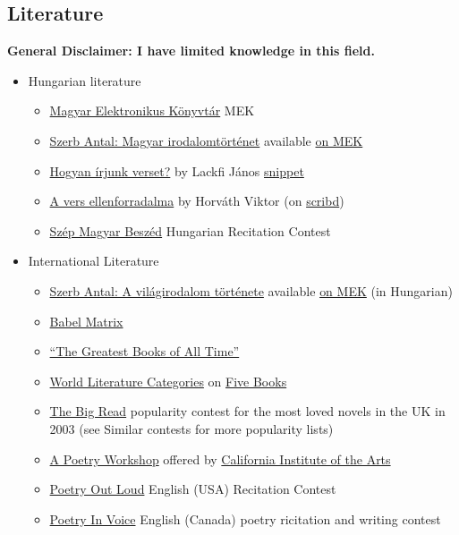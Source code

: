\documentclass{article}
\begin{document}
\subsection{Literature}
\textbf{General Disclaimer: I have limited knowledge in this field.}


\begin{itemize}
    \item Hungarian literature
    \begin{itemize}
        \item \href{https://mek.oszk.hu/}{Magyar Elektronikus Könyvtár} MEK
        \item \href{https://moly.hu/konyvek/szerb-antal-magyar-irodalomtortenet}{Szerb Antal: Magyar irodalomtörténet} available \href{https://mek.oszk.hu/14800/14871/}{on MEK}
        \item \href{https://moly.hu/konyvek/lackfi-janos-hogyan-irjunk-verset}{Hogyan írjunk verset?} by Lackfi János \href{https://olvassbele.com/2021/02/05/lackfi-janos-hogyan-irjunk-verset-reszlet/}{snippet}
        \item \href{https://moly.hu/konyvek/horvath-viktor-a-vers-ellenforradalma}{A vers ellenforradalma} by Horváth Viktor (on \href{https://www.scribd.com/book/342092705/A-vers-ellenforradalma-A-versiras-es-versforditas-tanulasa-es-tanitasa}{scribd})
        \item \href{https://szepmagyarbeszed.hu/}{Szép Magyar Beszéd} Hungarian Recitation Contest
    \end{itemize}
    \item International Literature
    \begin{itemize}
        \item \href{https://moly.hu/konyvek/szerb-antal-a-vilagirodalom-tortenete}{Szerb Antal: A világirodalom története} available \href{https://mek.oszk.hu/14800/14872/}{on MEK} (in Hungarian)
        \item \href{https://www.babelmatrix.org/}{Babel Matrix}
        \item \href{https://thegreatestbooks.org/}{``The Greatest Books of All Time''}
        \item \href{https://fivebooks.com/category/fiction/world-literature-books/}{World Literature Categories} on \href{https://fivebooks.com/}{Five Books}
        \item \href{https://en.wikipedia.org/wiki/The_Big_Read}{The Big Read} popularity contest for the most loved novels in the UK in 2003 (see Similar contests for more popularity lists) 
        \item \href{https://www.coursera.org/learn/poetry-workshop}{A Poetry Workshop} offered by \href{https://calarts.edu/}{California Institute of the Arts}
        \item \href{https://www.poetryoutloud.org/}{Poetry Out Loud} English (USA) Recitation Contest
        \item \href{https://www.poetryinvoice.com/}{Poetry In Voice} English (Canada) poetry ricitation and writing contest
    \end{itemize}
\end{itemize}
\end{document}
